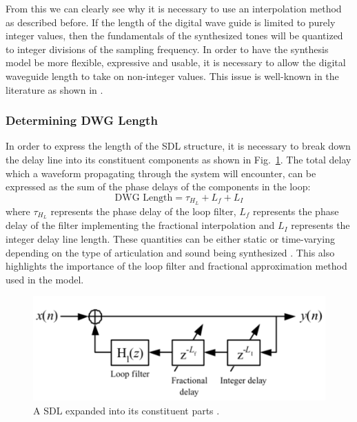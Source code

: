 \documentclass[main.tex]{subfiles}
\begin{document}
From this we can clearly see why it is necessary to use an interpolation method as described before. If the length of the digital wave guide is limited to purely integer values, then the fundamentals of the synthesized tones will be quantized to integer divisions of the sampling frequency. In order to have the synthesis model be more flexible, expressive and usable, it is necessary to allow the digital waveguide length to take on non-integer values. This issue is well-known in the literature as shown in .

\subsubsection{Determining DWG Length}
In order to express the length of the SDL structure, it is necessary to break down the delay line into its constituent components as shown in Fig.~\ref{fig:SDLBreakdown}. The total delay which a waveform propagating through the system will encounter, can be expressed as the sum of the phase delays of the components in the loop: 
\begin{equation}
    \text{DWG Length} = \tau_{H_L} + L_f + L_I
\end{equation}
where $\tau_{H_L}$ represents the phase delay of the loop filter, $L_f$ represents the phase delay of the filter implementing the fractional interpolation and $L_I$ represents the integer delay line length. These quantities can be either static or time-varying depending on the type of articulation and sound being synthesized . This also highlights the importance of the loop filter and fractional approximation method used in the model.

\begin{figure}[h]
    \centering
    \includegraphics[scale=1]{./images/diagrams/SDLModelExpanded.png}
    \caption{A SDL expanded into its constituent parts .}
    \label{fig:SDLBreakdown}
\end{figure}
\end{document}
